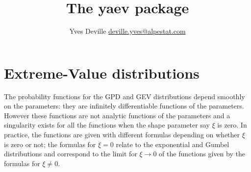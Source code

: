 \documentclass[11pt]{article}\usepackage[]{graphicx}\usepackage[]{xcolor}
\title{The \textbf{yaev} package}
\author{Yves Deville \href{mailto:deville.yves@alpestat.com}%
  {deville.yves@alpestat.com} }
\begin{document}
\maketitle{}
\tableofcontents{}

\section{Extreme-Value distributions}
  
The probability functions for the GPD and GEV distributions depend
smoothly on the parameters: they are infinitely differentiable
functions of the parameters. However these functions are not analytic
functions of the parameters and a singularity exists for all the
functions when the shape parameter say $\xi$ is zero.  In practice,
the functions are given with different formulas depending on whether
$\xi$ is zero or not; the formulas for $\xi = 0$ relate to the
exponential and Gumbel distributions and correspond to the limit for
$\xi \to 0$ of the functions given by the formulas for $\xi \neq 0$.
\end{document}
